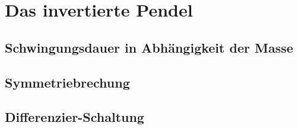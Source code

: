 

\section{Das invertierte Pendel}
\label{sec:invertPendel}

\subsection{Schwingungsdauer in Abhängigkeit der Masse}
\label{sub:schwingungsdauer}

\subsection{Symmetriebrechung}
\label{sub:symbrechung}

\subsection{Differenzier-Schaltung}
\label{sub:diffSchaltung}
